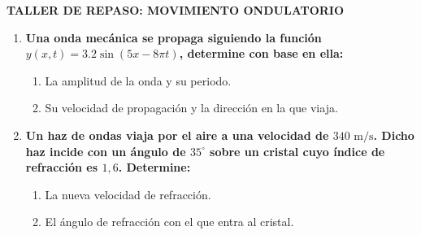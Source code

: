 \documentclass[11pt, letterpaper]{article}
\newif\ifshowanswers
\newcommand{\answer}[1]{ 
	\ifshowanswers 
	\par\vspace{0.15cm} 
	{\color{valblue}\small\textbf{Solución:}\\ #1} 
	\par\vspace{0.15cm} 
	\else 
	\par\vspace{3.5cm} %
	\fi 
}
\begin{document}
 
	
	\begin{center} 
		{\large \textbf{TALLER DE REPASO: MOVIMIENTO ONDULATORIO}}
	\end{center} 
	
	\begin{enumerate}[leftmargin=*, itemsep=0.8cm] 
		
		\item \textbf{ Una onda mecánica se propaga siguiendo la función $y(x,t) = 3.2 \sin(5x - 8\pi t)$, determine con base en ella:} 
		\begin{enumerate}[label=\alph*., itemsep=0.4cm, leftmargin=0.8cm] 
			\item La amplitud de la onda y su periodo. 
			\answer{ Según la estructura $y(x,t) = A \sin(kx - \omega t)$:\\ 
				$\bullet$ Amplitud $A = \mathbf{3.2\text{ m}}$.\\ 
				$\bullet$ Frecuencia angular $\omega = 8\pi\text{ rad/s} \implies T = \frac{2\pi}{\omega} = \frac{2\pi}{8\pi} = \mathbf{0.25\text{ s}}$ (o $\frac{1}{4}\text{ s}$). } 
			
			\item Su velocidad de propagación y la dirección en la que viaja. 
			\answer{ $\bullet$ Número de onda $k = 5\text{ rad/m}$.\\ 
				$\bullet$ Velocidad $v = \frac{\omega}{k} = \frac{8\pi}{5} = \mathbf{1.6\pi\text{ m/s}} \approx \mathbf{5.02\text{ m/s}}$.\\
				$\bullet$ Como el signo entre $kx$ y $\omega t$ es negativo, la onda viaja hacia la \textbf{derecha}. } 
		\end{enumerate} 
		
		\item \textbf{ Un haz de ondas viaja por el aire a una velocidad de $340\text{ m/s}$. Dicho haz incide con un ángulo de $35^\circ$ sobre un cristal cuyo índice de refracción es $1,6$. Determine:} 
		\begin{enumerate}[label=\alph*., itemsep=0.4cm, leftmargin=0.8cm] 
			\item La nueva velocidad de refracción. 
			\answer{ Sabiendo que $v_2 = \frac{v_1 \cdot n_1}{n_2}$ o $v_2 = \frac{v_1}{n_2}$ (porque viene del aire):\\
				$v_2 = \frac{340\text{ m/s}}{1.6} = \mathbf{212.5\text{ m/s}}$. } 
			
			\item El ángulo de refracción con el que entra al cristal. 
			\answer{ Aplicamos la Ley de Snell: $n_1 \sin(\theta_1) = n_2 \sin(\theta_2)$.\\ 
				$1.0 \cdot \sin(35^\circ) = 1.6 \cdot \sin(\theta_2) \implies \sin(\theta_2) = \frac{0.5735}{1.6} \approx 0.3584$.\\ 
				$\theta_2 = \arcsin(0.3584) \approx \mathbf{20.99^\circ}$ (o $21^\circ$). } 
		\end{enumerate} 
		

\end{enumerate}
\end{document}
